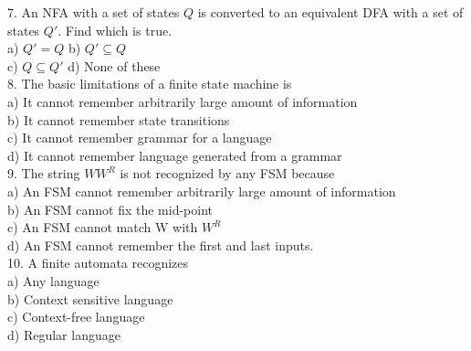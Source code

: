 7. An NFA with a set of states $Q$ is converted to an equivalent DFA with a set of states $Q'$. Find which is true.\\
\hspace*{0.5cm} a) $Q' = Q$             \hspace*{0.7cm}     b) $Q' \subseteq Q$ \\
\hspace*{0.5cm} c) $Q \subseteq Q'$        \hspace*{0.7cm}  d) None of these \\

\vspace*{0.2cm}
8. The basic limitations of a finite state machine is \\
\hspace*{0.5cm} a) It cannot remember arbitrarily large amount of information \\
\hspace*{0.5cm} b) It cannot remember state transitions \\
\hspace*{0.5cm} c) It cannot remember grammar for a language \\
\hspace*{0.5cm} d) It cannot remember language generated from a grammar \\

\vspace*{0.2cm}
9. The string $WW^R$ is not recognized by any FSM because \\
\hspace*{0.5cm} a) An FSM cannot remember arbitrarily large amount of information\\
\hspace*{0.5cm} b) An FSM cannot fix the mid-point \\
\hspace*{0.5cm} c) An FSM cannot match W with $W^R$ \\
\hspace*{0.5cm} d) An FSM cannot remember the first and last inputs.\\

\vspace*{0.2cm}
10. A finite automata recognizes\\
\hspace*{0.5cm} a) Any language\\
\hspace*{0.5cm} b) Context sensitive language \\
\hspace*{0.5cm} c) Context-free language \\
\hspace*{0.5cm} d) Regular language \\

